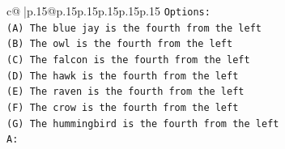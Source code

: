 \documentclass{article}
\begin{document}
{\begin{supertabular}{c@{$\;$}|p{.15\linewidth}@{}p{.15\linewidth}p{.15\linewidth}p{.15\linewidth}p{.15\linewidth}p{.15\linewidth}}
{{{\texttt{Options:} \\
\texttt{(A) The blue jay is the fourth from the left} \\
\texttt{(B) The owl is the fourth from the left} \\
\texttt{(C) The falcon is the fourth from the left} \\
\texttt{(D) The hawk is the fourth from the left} \\
\texttt{(E) The raven is the fourth from the left} \\
\texttt{(F) The crow is the fourth from the left} \\
\texttt{(G) The hummingbird is the fourth from the left} \\
\texttt{A:} \\
            }
        }
    }
     \\ \\


\end{supertabular}}
\end{document}
